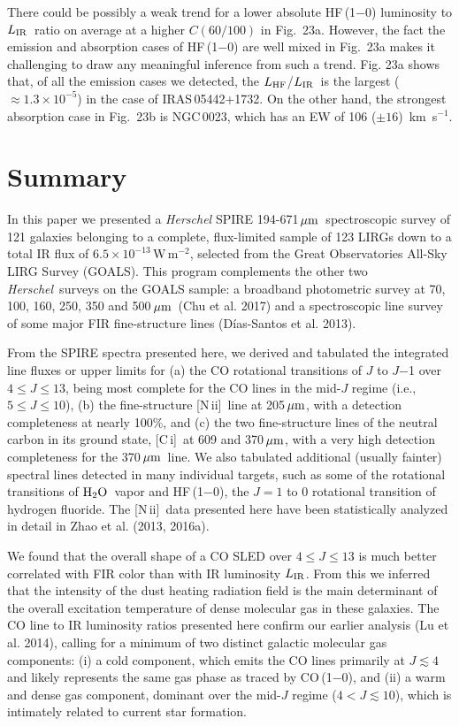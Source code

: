 \documentclass[preprint]{aastex}
\newcommand{\um}{\mbox{$\,\mu{\rm m}$}}
\newcommand{\kms}{\mbox{\,km~s$^{-1}$}}
\newcommand{\Herschel}{{\it Herschel}}
\newcommand{\Water}{\mbox{${\rm H}_2{\rm O}$}}
\newcommand{\CI}{[C\,{\sc i}]}
\newcommand{\LIR}{\mbox{$L_{\rm IR}$}}
\newcommand{\NII}{\mbox{[N\,{\sc ii}]}}
\begin{document}
There could be possibly a weak trend for a lower absolute HF\,(1$-$0) luminosity 
to \LIR\ ratio on average at a higher $C(60/100)$ in Fig.~23a. However, the fact 
the emission and absorption cases of HF\,(1$-$0) are well mixed in Fig.~23a makes it 
challenging to draw any meaningful inference from such a trend.
Fig. 23a shows that, of all the emission cases we detected, the $L_{\rm HF}$/\LIR\ is 
the largest ($\approx 1.3 \times 10^{-5}$) in the case of IRAS\,05442+1732.   On the other
hand,  the strongest absorption case in Fig.~23b is NGC\,0023, which has an EW of 106 
($\pm 16$) \kms. 





\section{Summary} \label{sec6}


In this paper we presented a {\it Herschel} SPIRE 194-671\um\ spectroscopic survey 
of 121 galaxies belonging to a complete, flux-limited sample of 123 LIRGs down to a 
total IR flux of $6.5\times 10^{-13}\,$W\,m$^{-2}$, selected from the Great Observatories 
All-Sky LIRG Survey (GOALS).  This program complements the other two \Herschel\ 
surveys on the GOALS sample: a broadband photometric survey at 70, 100, 160, 250, 
350 and 500\um\ (Chu et al. 2017) and a spectroscopic line survey of some major 
FIR fine-structure lines (D\'ias-Santos et al. 2013).


From the SPIRE spectra presented here, we derived and tabulated the integrated
line fluxes 
or upper limits for (a) the CO rotational transitions of $J$ to $J$$-$1 over 
$4 \leqslant J \leqslant 13$, being most complete for the CO lines in 
the mid-$J$ regime (i.e., $5 \leqslant J \leqslant 10$),  (b) the fine-structure 
\NII\ line at 205\um, with a detection completeness at nearly 100\%, and 
(c) the two fine-structure lines of the neutral carbon in its ground state, 
\CI\ at 609 and 370\um, with a very high detection completeness for the 370\um\ 
line.   We also tabulated additional (usually fainter) spectral lines detected 
in many individual targets, such as some of the rotational transitions of 
\Water\ vapor and HF\,(1$-$0), the $J = 1$ to 0 rotational transition of 
hydrogen fluoride.   The \NII\ data presented here have been statistically 
analyzed in detail in Zhao et al. (2013, 2016a).


We found that the overall shape of a CO SLED over $4 \leqslant J \leqslant 
13$ is much better correlated with FIR color than with IR luminosity \LIR. 
From this we inferred that the intensity of the dust 
heating radiation field is the main determinant of the overall excitation 
temperature of dense molecular gas in these galaxies.  The CO line to IR 
luminosity ratios presented here confirm our earlier analysis (Lu et al. 2014), 
calling for a minimum of two distinct galactic molecular gas components:
(i) a cold component, which emits the CO lines primarily at $J \lesssim 4$ 
and likely represents the same gas phase as traced by  CO\,(1$-$0), and 
(ii) a warm and dense gas component, dominant over the mid-$J$ regime ($4 < J 
\lesssim 10$), which is intimately related to current star formation. 
\end{document}
